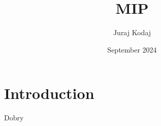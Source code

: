 \documentclass{article}
\title{MIP}
\author{Juraj Kodaj}
\date{September 2024}
\begin{document}
\maketitle

\section{Introduction}
Dobry
\end{document}
